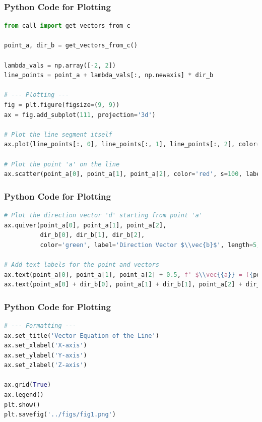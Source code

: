 \documentclass{beamer}
\theoremstyle{remark}
\let\vec\mathbf
\numberwithin{equation}{section}
\begin{document}
\begin{frame}[fragile]
\frametitle{Python Code for Plotting}
\begin{lstlisting}[language=Python]
from call import get_vectors_from_c

point_a, dir_b = get_vectors_from_c()
 
lambda_vals = np.array([-2, 2])
line_points = point_a + lambda_vals[:, np.newaxis] * dir_b

# --- Plotting ---
fig = plt.figure(figsize=(9, 9))
ax = fig.add_subplot(111, projection='3d')

# Plot the line segment itself
ax.plot(line_points[:, 0], line_points[:, 1], line_points[:, 2], color='blue', label='The Line')

# Plot the point 'a' on the line
ax.scatter(point_a[0], point_a[1], point_a[2], color='red', s=100, label='Point $\\vec{a}$')

\end{lstlisting}
\end{frame}

\begin{frame}[fragile]
\frametitle{Python Code for Plotting}
\begin{lstlisting}[language=Python]
  # Plot the direction vector 'd' starting from point 'a'
ax.quiver(point_a[0], point_a[1], point_a[2], 
          dir_b[0], dir_b[1], dir_b[2], 
          color='green', label='Direction Vector $\\vec{b}$', length=5, arrow_length_ratio=0.3)

# Add text labels for the point and vectors
ax.text(point_a[0], point_a[1], point_a[2] + 0.5, f' $\\vec{{a}} = ({point_a[0]:.0f}, {point_a[1]:.0f}, {point_a[2]:.0f})$')
ax.text(point_a[0] + dir_b[0], point_a[1] + dir_b[1], point_a[2] + dir_b[2], ' $\\vec{b}$')
\end{lstlisting}
\end{frame}

\begin{frame}[fragile]
\frametitle{Python Code for Plotting}
\begin{lstlisting}[language=Python]
# --- Formatting ---
ax.set_title('Vector Equation of the Line')
ax.set_xlabel('X-axis')
ax.set_ylabel('Y-axis')
ax.set_zlabel('Z-axis')

ax.grid(True)
ax.legend()
plt.show()
plt.savefig('../figs/fig1.png')
\end{lstlisting}
\end{frame}
\end{document}
